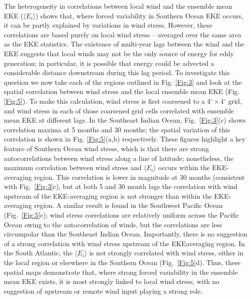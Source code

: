 \documentclass[linenumbers]{agujournal2019}
\begin{document}
The heterogeneity in correlations between local wind and the ensemble mean EKE ($\langle E_i \rangle$) shows that, where forced variability in Southern Ocean EKE occurs, it can be partly explained by variations in wind stress.
However, these correlations are based purely on local wind stress -- averaged over the same area as the EKE statistics.
The existence of multi-year lags between the wind and the EKE suggests that local winds may not be the only source of energy for eddy generation; in particular, it is possible that energy could be advected a considerable distance downstream during this lag period.
To investigate this question we now take each of the regions outlined in Fig. \ref{Fig:3} and look at the spatial correlation between wind stress and the local ensemble mean EKE (Fig. \ref{Fig:5}).
To make this calculation, wind stress is first coarsened to a 4$^\circ \times $4$^\circ$ grid, and wind stress in each of those coarsened grid cells correlated with ensemble mean EKE at different lags.
In the Southeast Indian Ocean, Fig.~\ref{Fig:3}(c) shows correlation maxima at 5 months and 30 months; the spatial variation of this correlation is shown in Fig. \ref{Fig:5}(a,b) respectively.
These figures highlight a key feature of Southern Ocean wind stress, which is that there are strong autocorrelations between wind stress along a line of latitude; nonetheless, the maximum correlation between wind stress and $\langle E_i \rangle$ occurs within the EKE-averaging region.
This correlation is lower in magnitude at 30 months (consistent with Fig.~\ref{Fig:3}c), but at both 5 and 30 month lags the correlation with wind upstream of the EKE-averaging region is not stronger than within the EKE-averaging region.
A similar result is found in the Southwest Pacific Ocean (Fig.~\ref{Fig:5}c); wind stress correlations are relatively uniform across the Pacific Ocean owing to the autocorrelation of winds, but the correlations are less circumpolar than the Southeast Indian Ocean.
Importantly, there is no suggestion of a strong correlation with wind stress upstream of the EKEaveraging region.
In the South Atlantic, the $\langle E_i \rangle$ is not strongly correlated with wind stress, either in the local region or elsewhere in the Southern Ocean (Fig.~\ref{Fig:5}d).
Thus, these spatial maps demonstrate that, where strong forced variability in the ensemble mean EKE exists, it is most strongly linked to local wind stress, with no suggestion of upstream or remote wind input playing a strong role. 
\end{document}
